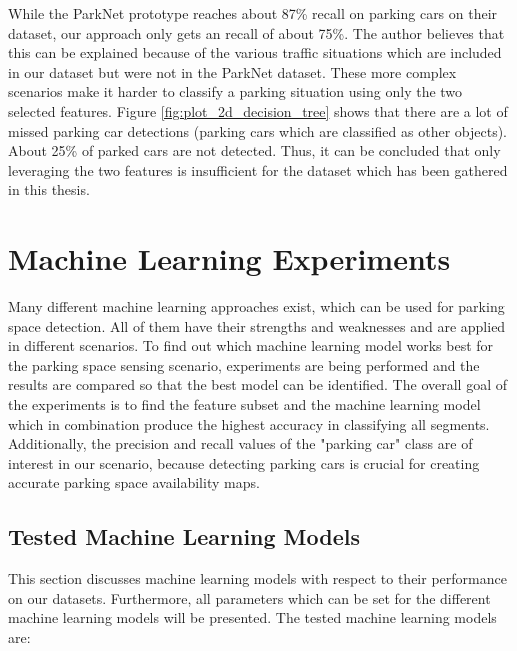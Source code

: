While the ParkNet prototype reaches about 87\% recall on parking cars on their dataset, our approach only gets an recall of about 75\%. The author believes that this can be explained because of the various traffic situations which are included in our dataset but were not in the ParkNet dataset. These more complex scenarios make it harder to classify a parking situation using only the two selected features.
Figure \ref{fig:plot_2d_decision_tree} shows that there are a lot of missed parking car detections (parking cars which are classified as other objects). About 25\% of parked cars are not detected. Thus, it can be concluded that only leveraging the two features is insufficient for the dataset which has been gathered in this thesis.










\section{Machine Learning Experiments}
\label{sec:machine_learning_experiments}

Many different machine learning approaches exist, which can be used for parking space detection. All of them have their strengths and weaknesses and are applied in different scenarios. To find out which machine learning model works best for the parking space sensing scenario, experiments are being performed and the results are compared so that the best model can be identified. 
The overall goal of the experiments is to find the feature subset and the machine learning model which in combination produce the highest accuracy in classifying all segments. 
Additionally, the precision and recall values of the "parking car" class are of interest in our scenario, because detecting parking cars is crucial for creating accurate parking space availability maps.





\subsection{Tested Machine Learning Models}
\label{sec:machine_learning_models}

This section discusses machine learning models with respect to their performance on our datasets. Furthermore, all parameters which can be set for the different machine learning models will be presented. The tested machine learning models are:


